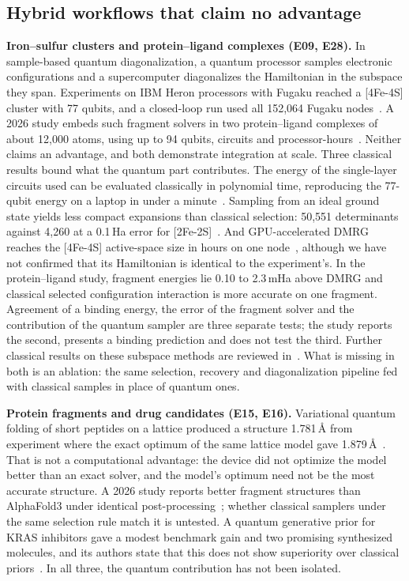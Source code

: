\subsection{Hybrid workflows that claim no advantage}
\textbf{Iron--sulfur clusters and protein--ligand complexes (E09, E28).} In sample-based quantum diagonalization, a quantum processor samples electronic configurations and a supercomputer diagonalizes the Hamiltonian in the subspace they span. Experiments on IBM Heron processors with Fugaku reached a [4Fe-4S] cluster with 77 qubits, and a closed-loop run used all 152{,}064 Fugaku nodes~\cite{shirakawa2025}. A 2026 study embeds such fragment solvers in two protein--ligand complexes of about 12{,}000 atoms, using up to 94 qubits, \merzCircuits{} circuits and \merzQpu{} processor-hours~\cite{merz2026}. Neither claims an advantage, and both demonstrate integration at scale. Three classical results bound what the quantum part contributes. The energy of the single-layer circuits used can be evaluated classically in polynomial time, reproducing the 77-qubit energy on a laptop in under a minute~\cite{belagali2026}. Sampling from an ideal ground state yields less compact expansions than classical selection: 50{,}551 determinants against 4{,}260 at a 0.1\,Ha error for [2Fe-2S]~\cite{reinholdt2025}. And GPU-accelerated DMRG reaches the [4Fe-4S] active-space size in \feDmrgH{} hours on one node~\cite{legeza2026}, although we have not confirmed that its Hamiltonian is identical to the experiment's. In the protein--ligand study, fragment energies lie 0.10 to 2.3\,mHa above DMRG and classical selected configuration interaction is more accurate on one fragment. Agreement of a binding energy, the error of the fragment solver and the contribution of the quantum sampler are three separate tests; the study reports the second, presents a binding prediction and does not test the third. Further classical results on these subspace methods are reviewed in~\cite{bonilla2026}. What is missing in both is an ablation: the same selection, recovery and diagonalization pipeline fed with classical samples in place of quantum ones.

\textbf{Protein fragments and drug candidates (E15, E16).} Variational quantum folding of short peptides on a lattice produced a structure 1.781\,\AA{} from experiment where the exact optimum of the same lattice model gave 1.879\,\AA~\cite{robert2021,doga2024}. That is not a computational advantage: the device did not optimize the model better than an exact solver, and the model's optimum need not be the most accurate structure. A 2026 study reports better fragment structures than AlphaFold3 under identical post-processing~\cite{zhang2026}; whether classical samplers under the same selection rule match it is untested. A quantum generative prior for KRAS inhibitors gave a modest benchmark gain and two promising synthesized molecules, and its authors state that this does not show superiority over classical priors~\cite{kras2025,uoft2025}. In all three, the quantum contribution has not been isolated.

